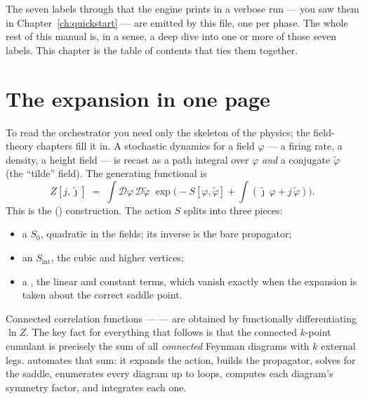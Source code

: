\begin{note}
The seven labels \code{[1/7]} through \code{[7/7]} that the engine prints in a
verbose run --- you saw them in Chapter~\ref{ch:quickstart} --- are emitted by
this file, one  per phase. The whole rest of this manual is, in a
sense, a deep dive into one or more of those seven labels. This chapter is the
table of contents that ties them together.
\end{note}

\section{The \protect\msrjd{} expansion in one page}\label{sec:co-msrjd}

To read the orchestrator you need only the skeleton of the physics; the
field-theory chapters fill it in. A stochastic dynamics for a field $\varphi$ ---
a firing rate, a density, a height field --- is recast as a path integral over
$\varphi$ \emph{and} a conjugate  $\tilde\varphi$ (the
``tilde'' field). The generating functional is
\begin{equation}
  Z[j,\tilde\jmath]
  \;=\;
  \int \mathcal{D}\varphi\,\mathcal{D}\tilde\varphi \;
  \exp\!\Big(-S[\varphi,\tilde\varphi]
    + \!\int (\tilde\jmath\,\varphi + j\,\tilde\varphi)\Big).
  \label{eq:co-Z}
\end{equation}
This is the  (\msrjd)
construction. The action $S$ splits into three pieces:

\begin{itemize}
  \item a  $S_0$, quadratic in the fields;
        its inverse is the bare propagator;
  \item an  $S_{\mathrm{int}}$, the cubic and higher
        vertices;
  \item a , the linear and constant terms, which
        vanish exactly when the expansion is taken about the correct saddle
        point.
\end{itemize}

Connected correlation functions ---  --- are obtained by
functionally differentiating $\ln Z$. The key fact for everything that follows is
that the connected $k$-point cumulant is precisely the sum of all
\emph{connected} Feynman diagrams with $k$ external legs. 
automates that sum: it expands the action, builds the propagator, solves for the
saddle, enumerates every diagram up to  loops, computes each
diagram's symmetry factor, and integrates each one.

